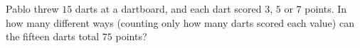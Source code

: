 Pablo threw $15$ darts at a dartboard, and each dart scored $3$, $5$ or $7$ points. In how many different ways (counting only how many darts scored each value) can the fifteen darts total $75$ points?
